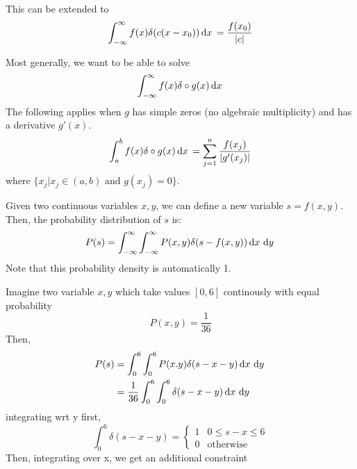 This can be extended to 
\begin{equation}
	\int_{-\infty}^\infty f(x)\delta(c(x-x_0))\d{x}=\frac{f(x_0)}{\abs{c}}
\end{equation}

Most generally, we want to be able to solve
\[\int_{-\infty}^\infty f(x) \delta\circ g(x)\d{x}\]
The following applies when \(g\) has simple zeros (no algebraic multiplicity) and has a derivative \(g'(x)\).
\begin{equation}
	\int_a^b f(x)\delta\circ g(x)\d{x}=\sum_{j=1}^n\frac{f(x_j)}{\abs{g'(x_j)}}
\end{equation}
where \(\{x_j | x_j\in (a,b) \text{ and } g(x_j)=0\}\).

Given two continuous variables \(x,y\), we can define a new variable \(s=f(x,y)\). Then, the probability distribution of \(s\) is:
\begin{equation}
P(s)=\int_{-\infty}^\infty\int_{-\infty}^\infty P(x,y)\delta(s-f(x,y))\d{x}\d{y}
\end{equation}
Note that this probability density is automatically 1.

\begin{aside}
	Imagine two variable \(x,y\) which take values \([0,6]\) continously with equal probability
	\[P(x,y)=\frac{1}{36}\]
	Then,
	\begin{align*}
		P(s)&=\int_0^6\int_0^6 P(x.y)\delta(s-x-y)\d{x}\d{y}\\
		    &=\frac{1}{36}\int_0^6\int_0^6 \delta(s-x-y)\d{x}\d{y}
	\end{align*}
	integrating wrt y first,
	\[\int_0^6\delta(s-x-y)=\begin{cases} 1 & 0\leq s-x \leq 6 \\ 0 &\text{otherwise}\end{cases}\] Then, integrating over x, we get an additional constraint
\end{aside}

